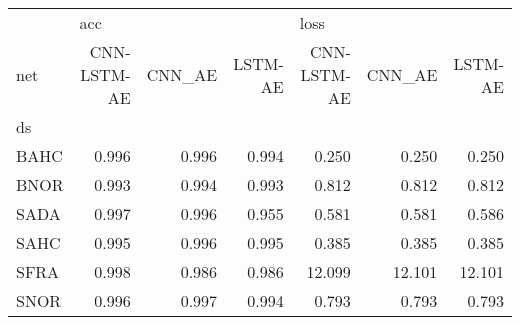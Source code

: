 \begin{tabular}{lrrrrrr}
\toprule
{} & \multicolumn{3}{l}{acc} & \multicolumn{3}{l}{loss} \\
net & CNN-LSTM-AE & CNN\_AE & LSTM-AE & CNN-LSTM-AE & CNN\_AE & LSTM-AE \\
ds   &             &        &         &             &        &         \\
\midrule
BAHC &       0.996 &  0.996 &   0.994 &       0.250 &  0.250 &   0.250 \\
BNOR &       0.993 &  0.994 &   0.993 &       0.812 &  0.812 &   0.812 \\
SADA &       0.997 &  0.996 &   0.955 &       0.581 &  0.581 &   0.586 \\
SAHC &       0.995 &  0.996 &   0.995 &       0.385 &  0.385 &   0.385 \\
SFRA &       0.998 &  0.986 &   0.986 &      12.099 & 12.101 &  12.101 \\
SNOR &       0.996 &  0.997 &   0.994 &       0.793 &  0.793 &   0.793 \\
\bottomrule
\end{tabular}
